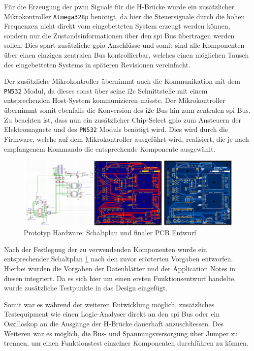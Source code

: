 Für die Erzeugung der \gls{pwm} Signale für die H-Brücke wurde ein
zusätzlicher Mikrokontroller \passthrough{\lstinline!Atmega328p!}
benötigt, da hier die Steuersignale durch die hohen Frequenzen nicht
direkt vom eingebetteten System erzeugt werden können, sondern nur die
Zustandsinformationen über den \gls{spi} Bus übertragen werden sollen.
Dies spart zusätzliche \gls{gpio} Anschlüsse und somit sind alle
Komponenten über einen einzigen zentralen Bus kontrollierbar, welches
einen möglichen Tausch des eingebetteten Systems in späteren Revisionen
vereinfacht.

Der zusätzliche Mikrokontroller übernimmt auch die Kommunikation mit dem
\passthrough{\lstinline!PN532!} Modul, da dieses sonst über seine
\gls{i2c} Schnittstelle mit einem entsprechenden Host-System
kommunizieren müsste. Der Mikrokontroller übernimmt somit ebenfalls die
Konversion des \gls{i2c} Bus hin zum zentralen \gls{spi} Bus. Zu
beachten ist, dass nun ein zusätzlicher Chip-Select \gls{gpio} zum
Ansteuern der Elektromagnete und des \passthrough{\lstinline!PN532!}
Moduls benötigt wird. Dies wird durch die Firmware, welche auf dem
Mikrokontroller ausgeführt wird, realisiert, die je nach empfangenem
Kommando die entsprechende Komponente ausgewählt.

\begin{figure}
\centering
\includegraphics{images/ATC_DK_HW_SCHEM.png}
\caption{Prototyp Hardware: Schaltplan und finaler PCB Entwurf
\label{ATC_Schematic_DK}}
\end{figure}

Nach der Festlegung der zu verwendenden Komponenten wurde ein
entsprechender Schaltplan \ref{ATC_Schematic_DK} nach den zuvor
erörterten Vorgaben entworfen. Hierbei wurden die Vorgaben der
Datenblätter\cite{tmc5160db}\cite{atmega328pdb} und der
Application Notes \cite{pn532apn}\cite{drv8833apn} in diesen
integriert. Da es sich hier um einen ersten Funktionsentwurf handelte,
wurde zusätzliche Testpunkte in das Design eingefügt.

Somit war es während der weiteren Entwicklung möglich, zusätzliches
Testequipment wie einen Logic-Analyser direkt an den \gls{spi} Bus oder
ein Oszilloskop an die Ausgänge der H-Brücke dauerhaft anzuschliessen.
Des Weiteren war es möglich, die Bus- und Spannungsversorgung über
Jumper zu trennen, um einen Funktionstest einzelner Komponenten
durchführen zu können.

